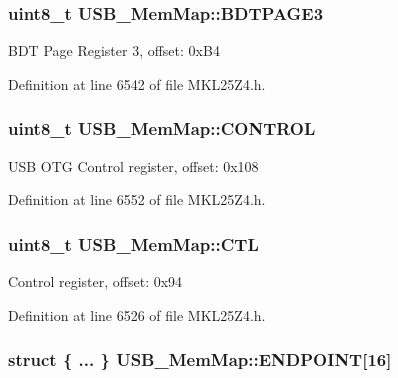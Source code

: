 \subsubsection[{\texorpdfstring{B\+D\+T\+P\+A\+G\+E3}{BDTPAGE3}}]{\setlength{\rightskip}{0pt plus 5cm}uint8\+\_\+t U\+S\+B\+\_\+\+Mem\+Map\+::\+B\+D\+T\+P\+A\+G\+E3}\hypertarget{struct_u_s_b___mem_map_afd1f5b8867e36b32297641c5fe0b283b}{}\label{struct_u_s_b___mem_map_afd1f5b8867e36b32297641c5fe0b283b}
B\+DT Page Register 3, offset\+: 0x\+B4 

Definition at line 6542 of file M\+K\+L25\+Z4.\+h.

\subsubsection[{\texorpdfstring{C\+O\+N\+T\+R\+OL}{CONTROL}}]{\setlength{\rightskip}{0pt plus 5cm}uint8\+\_\+t U\+S\+B\+\_\+\+Mem\+Map\+::\+C\+O\+N\+T\+R\+OL}\hypertarget{struct_u_s_b___mem_map_a98ff4d7ab9c41c673ee41053dc484447}{}\label{struct_u_s_b___mem_map_a98ff4d7ab9c41c673ee41053dc484447}
U\+SB O\+TG Control register, offset\+: 0x108 

Definition at line 6552 of file M\+K\+L25\+Z4.\+h.

\subsubsection[{\texorpdfstring{C\+TL}{CTL}}]{\setlength{\rightskip}{0pt plus 5cm}uint8\+\_\+t U\+S\+B\+\_\+\+Mem\+Map\+::\+C\+TL}\hypertarget{struct_u_s_b___mem_map_a52b35d0e8644631558a65f9b7a9b8b4b}{}\label{struct_u_s_b___mem_map_a52b35d0e8644631558a65f9b7a9b8b4b}
Control register, offset\+: 0x94 

Definition at line 6526 of file M\+K\+L25\+Z4.\+h.

\subsubsection[{\texorpdfstring{E\+N\+D\+P\+O\+I\+NT}{ENDPOINT}}]{\setlength{\rightskip}{0pt plus 5cm}struct \{ ... \}   U\+S\+B\+\_\+\+Mem\+Map\+::\+E\+N\+D\+P\+O\+I\+NT\mbox{[}16\mbox{]}}\hypertarget{struct_u_s_b___mem_map_af56587a25ad8b3d5c1353e436046a7be}{}\label{struct_u_s_b___mem_map_af56587a25ad8b3d5c1353e436046a7be}
